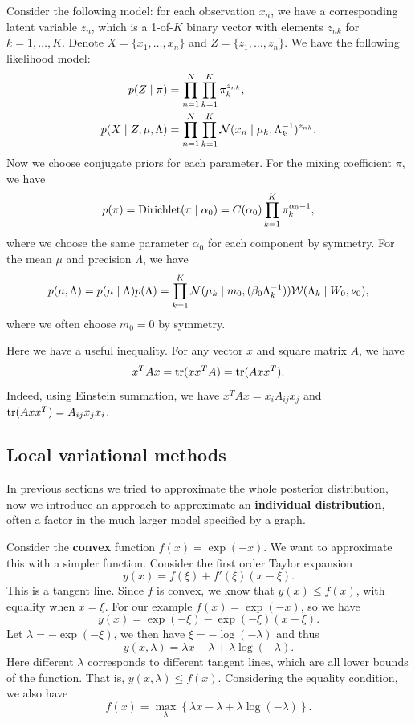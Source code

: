 \documentclass[a4paper]{article}
\begin{document}
Consider the following model: for each observation
$x_n$, we have a corresponding latent variable
$z_n$, which is a 1-of-$K$ binary vector with elements 
$z_{nk}$ for $k = 1, \dots, K$. Denote $X = \{x_1, \dots, 
x_n\}$ and $Z = \{z_1, \dots, z_n\}$. We have the 
following likelihood model:
\[
\begin{aligned}
p(Z \mid \pi) &= \prod_{n=1}^N \prod_{k=1}^K \pi_k^{z_{nk}}, \\
p(X \mid Z, \mu, \Lambda)
&= \prod_{n=1}^N \prod_{k=1}^K \mathcal{N}(x_n \mid \mu_k, \Lambda_k^{-1})
^{z_{nk}}.
\end{aligned}
\]
Now we choose conjugate priors for each parameter. For 
the mixing coefficient $\pi$, we have
\[
\begin{aligned}
p(\pi) = \operatorname{Dirichlet}(\pi \mid \alpha_0)
= C(\alpha_0) \prod_{k=1}^K \pi_k^{\alpha_0 - 1},
\end{aligned}
\]
where we choose the same parameter $\alpha_0$ for each 
component by symmetry. For the mean $\mu$ and precision
$\Lambda$, we have
\[
\begin{aligned}
p(\mu, \Lambda) 
= p(\mu \mid \Lambda) p(\Lambda) 
= \prod_{k=1}^K \mathcal{N} (\mu_k \mid m_0, (\beta_0 \Lambda_k^{-1}))
\mathcal{W} (\Lambda_k \mid W_0, \nu_0),
\end{aligned}
\]
where we often choose $m_0 = 0$ by symmetry.

Here we have a useful inequality. For any vector $x$ and square matrix 
$A$, we have 
\[
x^T A x = \operatorname{tr} (x x^T A) = \operatorname{tr} (A x x^T). 
\]
Indeed, using Einstein summation, we have $x^T A x = x_i A_{ij} x_j$ and 
$\operatorname{tr} (A x x^T) = A_{ij} x_j x_i$. 


\subsection{Local variational methods}

In previous sections we tried to approximate the whole
posterior distribution, now we introduce an approach
to approximate an \textbf{individual distribution}, often a 
factor in the much larger model specified by a graph.

Consider the \textbf{convex} function $f(x) = \exp (-x)$. 
We want to approximate this with a simpler function.
Consider the first order Taylor expansion
\[
y(x) = f(\xi) + f'(\xi) (x - \xi).
\]
This is a tangent line.
Since $f$ is convex, we know that $y(x) \leq f(x)$,
with equality when $x = \xi$. For our example
$f(x) = \exp (-x)$, so we have 
\[
y(x) = \exp (- \xi) - \exp (- \xi) (x - \xi).
\]
Let $\lambda = - \exp (- \xi)$, we then have
$\xi = - \log (- \lambda)$ and thus 
\[
y(x, \lambda) = 
\lambda x - \lambda + \lambda \log (- \lambda).
\]
Here different $\lambda$ corresponds to different tangent 
lines, which are all lower bounds of the function. 
That is, $y(x, \lambda) \leq f(x)$. Considering the 
equality condition, we also have 
\[
f(x) = \max_\lambda \left\{ \lambda x - \lambda + \lambda 
\log (- \lambda) \right\}.
\]
\end{document}
